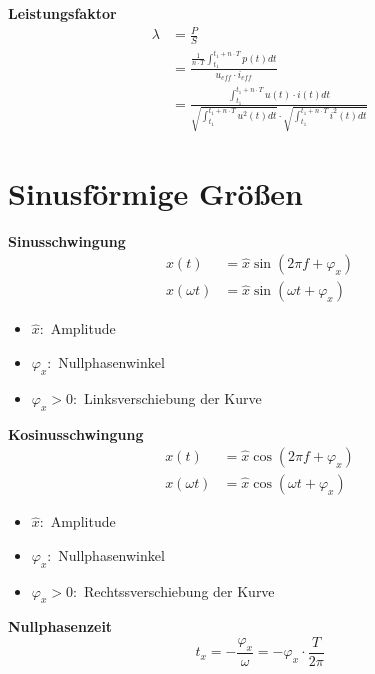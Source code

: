 \textbf{Leistungsfaktor}
\begin{align*}
\lambda &= \frac{P}{S} \\
	&= \frac{\frac{1}{n \cdot T} \int_{t_{1}}^{t_{1} + n \cdot T} p\left( t \right) dt}
	   { u_{eff} \cdot i_{eff}} \\
	&=  \frac{ \int_{t_{1}}^{t_{1} + n \cdot T} u \left( t \right) \cdot i \left( t \right) dt}
	   {\sqrt{ \int_{t_{1}}^{t_{1} + n \cdot T} u^2 \left( t \right) dt} \cdot
	    \sqrt{ \int_{t_{1}}^{t_{1} + n \cdot T} i^2 \left( t \right) dt}}
\end{align*}

\newpage
\section{Sinusförmige Größen}
\begin{multicols}{2}{}
 \textbf{Sinusschwingung}
  \begin{align*}
   x\left(t\right) &= \hat{x} \sin\left( 2 \pi f + \varphi_x\right) \\
   x\left( \omega t \right) &= \hat{x} \sin\left( \omega t + \varphi_x\right)
  \end{align*}
  \begin{itemize}
   \item \(\hat{x} :\) Amplitude
   \item \(\varphi_x :\) Nullphasenwinkel
   \item \(\varphi_{x}>0 :\) Linksverschiebung der Kurve
  \end{itemize}

 \textbf{Kosinusschwingung}
  \begin{align*}
   x\left(t\right) &= \hat{x} \cos\left( 2 \pi f + \varphi_x\right) \\
   x\left( \omega t \right) &= \hat{x} \cos\left( \omega t + \varphi_x\right)
  \end{align*}
  \begin{itemize}
   \item \(\hat{x} :\) Amplitude
   \item \(\varphi_x :\) Nullphasenwinkel
   \item \(\varphi_{x}>0 :\) Rechtssverschiebung der Kurve
  \end{itemize}
\end{multicols}

\textbf{Nullphasenzeit}
\[ t_{x} = -\frac{\varphi_x}{\omega} = -\varphi_x \cdot \frac{T}{2 \pi} \]

